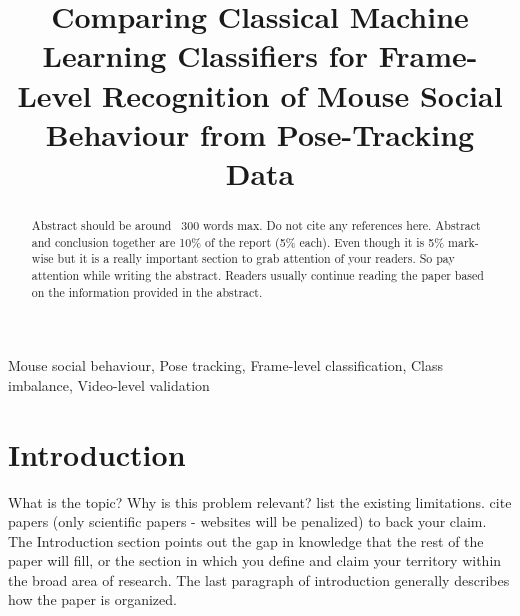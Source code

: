 \documentclass[conference]{IEEEtran}
\begin{document}
\title{Comparing Classical Machine Learning Classifiers for Frame-Level Recognition of Mouse Social Behaviour from Pose-Tracking Data}
\author{
}

\maketitle

\begin{abstract}
Abstract should be around ~300 words max. Do not cite any references here. Abstract and conclusion together are 10\% of the report (5\% each). Even though it is 5\% mark-wise but it is a really important section to grab attention of your readers. So pay attention while writing the abstract. Readers usually continue reading the paper based on the information provided in the abstract.

\end{abstract}

\begin{IEEEkeywords}
Mouse social behaviour, Pose tracking, Frame-level classification, Class imbalance, Video-level validation
\end{IEEEkeywords}


\section{Introduction} \label{sec:intro}
What is the topic? Why is this problem relevant? list the existing limitations. cite papers (only scientific papers - websites will be penalized) to back your claim. The Introduction section points out the gap in knowledge that the rest of the paper will fill, or the section in which you define and claim your territory within the broad area of research. The last paragraph of introduction generally describes how the paper is organized. \\
\end{document}
